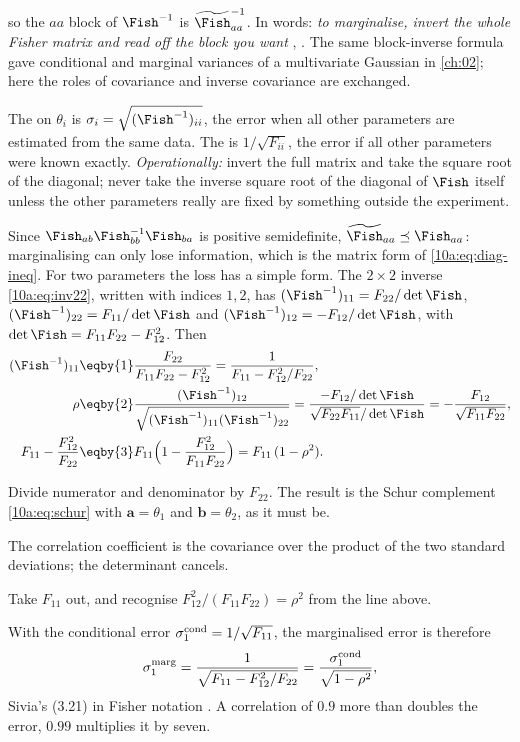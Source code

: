 so the $aa$ block of $\Fish^{-1}$ is $\widetilde{\Fish}_{aa}^{-1}$. In words: \emph{to marginalise, invert the whole Fisher
matrix and read off the block you want} , \cite{Coe2009}. The same block-inverse
formula gave conditional and marginal variances of a multivariate Gaussian in \cref{ch:02}; here the roles of
covariance and inverse covariance are exchanged.

\begin{workdef}
The  on $\theta_i$ is $\sigma_i=\sqrt{(\Fish^{-1})_{ii}}$, the error when all other parameters are
estimated from the same data. The  is $1/\sqrt{F_{ii}}$, the error if all other
parameters were known exactly. \emph{Operationally:} invert the full matrix and take the square root of the
diagonal; never take the inverse square root of the diagonal of $\Fish$ itself unless the other parameters
really are fixed by something outside the experiment.
\end{workdef}

Since $\Fish_{ab}\Fish_{bb}^{-1}\Fish_{ba}$ is positive semidefinite, $\widetilde{\Fish}_{aa}\preceq\Fish_{aa}$: marginalising can
only lose information, which is the matrix form of \eqref{10a:eq:diag-ineq}. For two parameters the loss has a
simple form. The $2\times2$ inverse \eqref{10a:eq:inv22}, written with indices $1,2$, has
$(\Fish^{-1})_{11}=F_{22}/\det\Fish$, $(\Fish^{-1})_{22}=F_{11}/\det\Fish$ and $(\Fish^{-1})_{12}=-F_{12}/\det\Fish$, with
$\det\Fish=F_{11}F_{22}-F_{12}^2$. Then
\begin{align*}
  (\Fish^{-1})_{11}
  &\eqby{1}\frac{F_{22}}{F_{11}F_{22}-F_{12}^2}
   =\frac1{F_{11}-F_{12}^2/F_{22}},
  \\
  \rho
  &\eqby{2}\frac{(\Fish^{-1})_{12}}{\sqrt{(\Fish^{-1})_{11}(\Fish^{-1})_{22}}}
   =\frac{-F_{12}/\det\Fish}{\sqrt{F_{22}F_{11}}/\det\Fish}
   =-\frac{F_{12}}{\sqrt{F_{11}F_{22}}},
  \\
  F_{11}-\frac{F_{12}^2}{F_{22}}
  &\eqby{3}F_{11}\Bigl(1-\frac{F_{12}^2}{F_{11}F_{22}}\Bigr)=F_{11}\,(1-\rho^2).
\end{align*}
\begin{explain}
  \item Divide numerator and denominator by $F_{22}$. The result is the Schur complement \eqref{10a:eq:schur} with
        $\bm a=\theta_1$ and $\bm b=\theta_2$, as it must be.
  \item The correlation coefficient is the covariance over the product of the two standard deviations; the
        determinant cancels.
  \item Take $F_{11}$ out, and recognise $F_{12}^2/(F_{11}F_{22})=\rho^2$ from the line above.
\end{explain}
With the conditional error $\sigma_1^{\rm cond}=1/\sqrt{F_{11}}$, the marginalised error is therefore
\begin{equation}
  \sigma_1^{\rm marg}=\frac{1}{\sqrt{F_{11}-F_{12}^2/F_{22}}}=\frac{\sigma_1^{\rm cond}}{\sqrt{1-\rho^2}} ,
  \label{10a:eq:marg-cond}
\end{equation}
Sivia's (3.21) in Fisher notation . A correlation of $0.9$ more than doubles the
error, $0.99$ multiplies it by seven.


